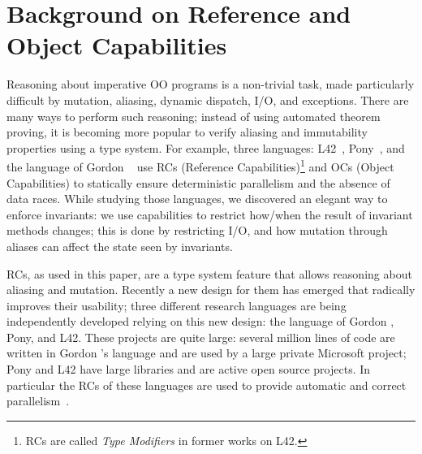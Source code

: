 \section{Background on Reference and Object Capabilities}
\label{s:TMsAndOCs}
Reasoning about imperative OO programs is a non-trivial task,
made particularly difficult by mutation, aliasing, dynamic dispatch, I/O, and exceptions. There are many ways to perform such reasoning;
instead of using automated theorem proving, 
it is becoming more popular to verify aliasing and immutability properties using a type system.
For example, three languages: L42~\cite{ServettoZucca15,ServettoEtAl13a,JOT:issue_2011_01/article1,GianniniEtAl16}, Pony~\cite{clebsch2015deny,clebsch2017orca}, and the language of Gordon \etal~\cite{GordonEtAl12} use RCs (Reference Capabilities)\footnote{RCs are called \emph{Type Modifiers} in former works on L42.} and OCs (Object Capabilities) to statically ensure  deterministic parallelism and the absence of data races.
While studying those languages, we discovered an elegant way to enforce invariants: we use capabilities to restrict how/when the result of invariant methods changes; this is done by restricting I/O, and how mutation through aliases can affect the state seen by invariants.


RCs, as used in this paper, are a type system feature that allows reasoning about aliasing and mutation. Recently a new design for them has emerged that radically improves their usability;
three different research languages are being independently developed relying on this new design: the language of Gordon \etal, Pony, and L42.
These projects are quite large: several million lines of code are written in Gordon \etal's language and are used by a large private Microsoft project; Pony and L42 have large libraries and are active open source projects. In particular the RCs of these languages are used to provide automatic and correct parallelism~\cite{GordonEtAl12,clebsch2015deny,clebsch2017orca,ServettoEtAl13a}.

